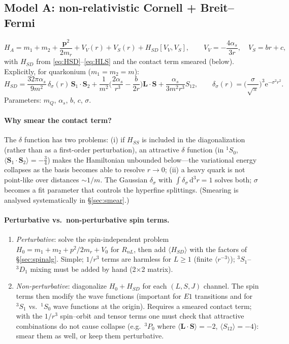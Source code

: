 \documentclass[11pt,a4paper]{article}
\numberwithin{equation}{section}
\theoremstyle{definition}
\theoremstyle{plain}
\theoremstyle{remark}
\newenvironment{keyresult}[1][Key result]{\begin{tcolorbox}[keybox,title={\small\bfseries #1},fonttitle=\small,coltitle=white,colbacktitle=MidnightBlue!70]}{\end{tcolorbox}}
\numberwithin{algorithm}{section}
\newcommand{\vp}{\bm p}
\newcommand{\vL}{\bm L}
\newcommand{\vS}{\bm S}
\newcommand{\as}{\alpha_s}
\newcommand{\dd}{\mathrm{d}}
\newcommand{\ee}{\mathrm{e}}
\newcommand{\mr}{m_r}
\begin{document}
\subsection{Model A: non-relativistic Cornell + Breit--Fermi}\label{sec:modelA}
\begin{keyresult}[Model A]
\begin{equation}
H_A=m_1+m_2+\frac{\vp^2}{2\mr}+V_V(r)+V_S(r)+H_{SD}[V_V,V_S],\qquad
V_V=-\frac{4\as}{3r},\quad V_S=br+c,
\label{eq:HA}
\end{equation}
with $H_{SD}$ from \eqref{eq:HSD}--\eqref{eq:HLS} and the contact term smeared (below). Explicitly, for quarkonium ($m_1=m_2=m$):
\begin{equation}
H_{SD}=\frac{32\pi\as}{9m^2}\,\delta_\sigma(r)\,\vS_1\!\cdot\!\vS_2+\frac{1}{m^2}\Big(\frac{2\as}{r^3}-\frac{b}{2r}\Big)\vL\!\cdot\!\vS+\frac{\as}{3m^2r^3}S_{12},
\qquad \delta_\sigma(r)=\Big(\frac{\sigma}{\sqrt\pi}\Big)^3\ee^{-\sigma^2r^2}.
\end{equation}
Parameters: $m_Q$, $\as$, $b$, $c$, $\sigma$.
\end{keyresult}

\paragraph{Why smear the contact term?} The $\delta$ function has two problems: (i) if $H_{SS}$ is included in the diagonalization (rather than as a first-order perturbation), an attractive $\delta$ function (in ${}^1S_0$, $\langle\vS_1\!\cdot\!\vS_2\rangle=-\frac34$) makes the Hamiltonian unbounded below---the variational energy collapses as the basis becomes able to resolve $r\to0$; (ii) a heavy quark is not point-like over distances $\sim1/m$. The Gaussian $\delta_\sigma$ with $\int\delta_\sigma\,\dd^3r=1$ solves both; $\sigma$ becomes a fit parameter that controls the hyperfine splittings. (Smearing is analysed systematically in \S\ref{sec:smear}.)

\paragraph{Perturbative vs.\ non-perturbative spin terms.}
\begin{enumerate}[leftmargin=1.5em,itemsep=2pt]
\item \emph{Perturbative}: solve the spin-independent problem $H_0=m_1+m_2+p^2/2\mr+V_0$ for $R_{nL}$, then add $\langle H_{SD}\rangle$ with the factors of \S\ref{sec:spinalg}. Simple; $1/r^3$ terms are harmless for $L\ge1$ (finite $\langle r^{-3}\rangle$); ${}^3S_1$--${}^3D_1$ mixing must be added by hand (2$\times$2 matrix).
\item \emph{Non-perturbative}: diagonalize $H_0+H_{SD}$ for each $(L,S,J)$ channel. The spin terms then modify the wave functions (important for $E1$ transitions and for ${}^3S_1$ vs.\ ${}^1S_0$ wave functions at the origin). Requires a smeared contact term; with the $1/r^3$ spin--orbit and tensor terms one must check that attractive combinations do not cause collapse (e.g.\ ${}^3P_0$ where $\langle\vL\!\cdot\!\vS\rangle=-2$, $\langle S_{12}\rangle=-4$): smear them as well, or keep them perturbative.
\end{enumerate}
\end{document}
